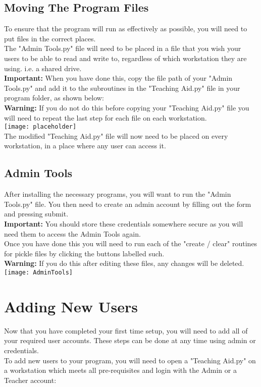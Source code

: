 \documentclass{report}
\begin{document}
\section{Moving The Program Files}
To ensure that the program will run as effectively as possible, you will need to put files in the correct places.\\
The "Admin Tools.py" file will need to be placed in a file that you wish your users to be able to read and write to, regardless of which workstation they are using. i.e. a shared drive.\\ \textbf{Important:} When you have done this, copy the file path of your "Admin Tools.py" and add it to the subroutines in the "Teaching Aid.py" file in your program folder, as shown below:\\
\textbf{Warning: }If you do not do this before copying your "Teaching Aid.py" file you will need to repeat the last step for each file on each workstation.\\
\texttt{[image: placeholder]}\\

The modified "Teaching Aid.py" file will now need to be placed on every workstation, in a place where any user can access it.
\section{Admin Tools}
After installing the necessary programs, you will want to run the "Admin Tools.py" file. You then need to create an admin account by filling out the form and pressing submit.\\
\textbf{Important: }You should store these credentials somewhere secure as you will need them to access the Admin Tools again.\\
 Once you have done this you will need to run each of the "create / clear" routines for pickle files by clicking the buttons labelled such.\\
 
\textbf{Warning: }If you do this after editing these files, any changes will be deleted.\\
\texttt{[image: AdminTools]}\\
\chapter{Adding New Users}
Now that you have completed your first time setup, you will need to add all of your required user accounts. These steps can be done at any time using admin or credentials.\\
To add new users to your program, you will need to open a "Teaching Aid.py" on a workstation which meets all pre-requisites and login with the Admin or a Teacher account:\\
\end{document}

